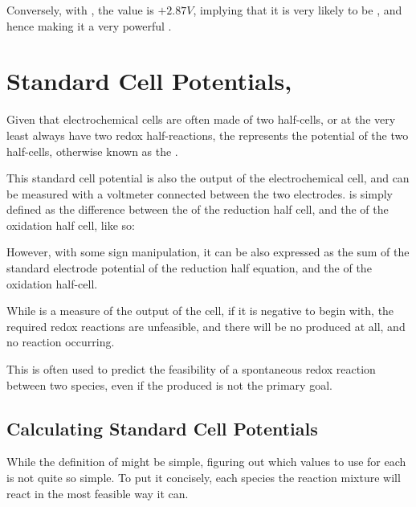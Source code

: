 			Conversely, with , the \Eo{} value is $+2.87V$, implying that it is very likely to be , and hence
			making it a very powerful .





	\pagebreak
	\section{Standard Cell Potentials, \texorpdfstring{\MEcell{}}{Ecell}}

		Given that electrochemical cells are often made of two half-cells, or at the very least always have two redox half-reactions,
		the \Ecell{} represents the  potential of the two half-cells, otherwise known as the .

		This standard cell potential is also the output  of the electrochemical cell, and can be measured with a voltmeter
		connected between the two electrodes. \Ecell{} is simply defined as the difference between the \Eo{} of the reduction half cell, and
		the \Eo{} of the oxidation half cell, like so:


		However, with some sign manipulation, it can be also expressed as the sum of the standard electrode potential of the reduction
		half equation, and the  of the oxidation half-cell.


		While \Ecell{} is a measure of the output  of the cell, if it is negative to begin with, the required redox
		reactions are unfeasible, and there will be no  produced at all, and no reaction occurring.

		This is often used to predict the feasibility of a spontaneous redox reaction between two species, even if the produced
		 is not the primary goal.


		\subsection{Calculating Standard Cell Potentials}

			While the definition of \Ecell{} might be simple, figuring out which values to use for each \Eo{} is not quite so simple. To put it
			concisely, each species the reaction mixture will react in the most feasible way it can.

